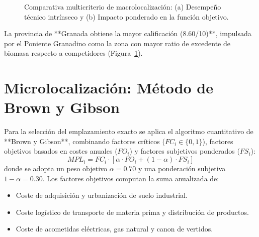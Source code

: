 \documentclass{report}
\begin{document}
\begin{figure}[H]
    \vspace{0.8em}
    \caption{Comparativa multicriterio de macrolocalización: (a) Desempeño técnico intrínseco y (b) Impacto ponderado en la función objetivo.}
    \label{fig:radar_macrolocalizacion}
\end{figure}

La provincia de **Granada obtiene la mayor calificación (8.60/10)**, impulsada por el Poniente Granadino como la zona con mayor ratio de excedente de biomasa respecto a competidores (Figura~\ref{fig:radar_macrolocalizacion}).

\section{Microlocalización: Método de Brown y Gibson}
Para la selección del emplazamiento exacto se aplica el algoritmo cuantitativo de **Brown y Gibson**, combinando factores críticos ($FC_i \in \{0, 1\}$), factores objetivos basados en costes anuales ($FO_i$) y factores subjetivos ponderados ($FS_i$):
\begin{equation}
    MPL_i = FC_i \cdot \left[ \alpha \cdot FO_i + (1 - \alpha) \cdot FS_i \right]
\end{equation}
donde se adopta un peso objetivo $\alpha = \num{0.70}$ y una ponderación subjetiva $1 - \alpha = \num{0.30}$.
Los factores objetivos computan la suma anualizada de:
\begin{itemize}
    \item Coste de adquisición y urbanización de suelo industrial.
    \item Coste logístico de transporte de materia prima y distribución de productos.
    \item Coste de acometidas eléctricas, gas natural y canon de vertidos.
\end{itemize}
\end{document}
